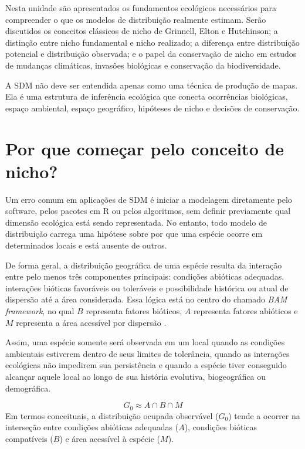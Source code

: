 Nesta unidade são apresentados os fundamentos ecológicos necessários para compreender o que os modelos de distribuição realmente estimam. Serão discutidos os conceitos clássicos de nicho de Grinnell, Elton e Hutchinson; a distinção entre nicho fundamental e nicho realizado; a diferença entre distribuição potencial e distribuição observada; e o papel da conservação de nicho em estudos de mudanças climáticas, invasões biológicas e conservação da biodiversidade.

\begin{conceito}
A SDM não deve ser entendida apenas como uma técnica de produção de mapas. Ela é uma estrutura de inferência ecológica que conecta ocorrências biológicas, espaço ambiental, espaço geográfico, hipóteses de nicho e decisões de conservação.
\end{conceito}

\section{Por que começar pelo conceito de nicho?}

Um erro comum em aplicações de SDM é iniciar a modelagem diretamente pelo software, pelos pacotes em R ou pelos algoritmos, sem definir previamente qual dimensão ecológica está sendo representada. No entanto, todo modelo de distribuição carrega uma hipótese sobre por que uma espécie ocorre em determinados locais e está ausente de outros.

De forma geral, a distribuição geográfica de uma espécie resulta da interação entre pelo menos três componentes principais: condições abióticas adequadas, interações bióticas favoráveis ou toleráveis e possibilidade histórica ou atual de dispersão até a área considerada. Essa lógica está no centro do chamado \textit{BAM framework}, no qual $B$ representa fatores bióticos, $A$ representa fatores abióticos e $M$ representa a área acessível por dispersão \parencite{soberon2005,soberon2009,barve2011crucial}.

Assim, uma espécie somente será observada em um local quando as condições ambientais estiverem dentro de seus limites de tolerância, quando as interações ecológicas não impedirem sua persistência e quando a espécie tiver conseguido alcançar aquele local ao longo de sua história evolutiva, biogeográfica ou demográfica.

\begin{equationbox}
\[
G_0 \approx A \cap B \cap M
\]
Em termos conceituais, a distribuição ocupada observável ($G_0$) tende a ocorrer na interseção entre condições abióticas adequadas ($A$), condições bióticas compatíveis ($B$) e área acessível à espécie ($M$).
\end{equationbox}

